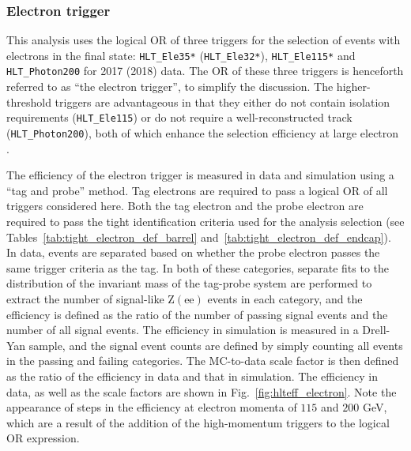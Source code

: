 \subsubsection{Electron trigger}

This analysis uses the logical OR of three triggers for the selection of events with electrons in the final state:
\texttt{HLT\_Ele35*} (\texttt{HLT\_Ele32*}),
\texttt{HLT\_Ele115*} and \texttt{HLT\_Photon200} for 2017 (2018) data. The OR of these three triggers is henceforth referred to as ``the electron trigger'',
to simplify the discussion. The higher-threshold triggers are advantageous in that they either do not contain isolation requirements (\texttt{HLT\_Ele115}) or do not require 
a well-reconstructed track (\texttt{HLT\_Photon200}), both of which enhance the selection efficiency at large electron \pt.

The efficiency of the electron trigger is measured in data and simulation using a ``tag and probe'' method. Tag electrons are required to pass a 
logical OR of all triggers considered here. Both the tag electron and the probe electron are required to pass the tight identification criteria used for the analysis 
selection (see Tables~\ref{tab:tight_electron_def_barrel} and~\ref{tab:tight_electron_def_endcap}). In data, events are separated based on whether the probe electron passes 
the same trigger criteria as the tag. In both of these categories, 
separate fits to the distribution of the invariant mass of the tag-probe system are performed to extract the number of signal-like $\textrm{Z}(\textrm{ee})$ 
events in each category, 
and the efficiency is defined as the ratio of the number of passing signal events and the number of all signal events. The efficiency in simulation is 
measured in a Drell-Yan sample, and the signal event counts are defined by simply counting all events in the passing and failing categories. The MC-to-data scale 
factor is then defined as the ratio of the efficiency in data and that in simulation. The efficiency in data, as well as the scale factors are shown in 
Fig.~\ref{fig:hlteff_electron}. Note the appearance of steps in the efficiency at electron momenta of $115$ and $200$ GeV, which are a result of the addition 
of the high-momentum triggers to the logical OR expression.

